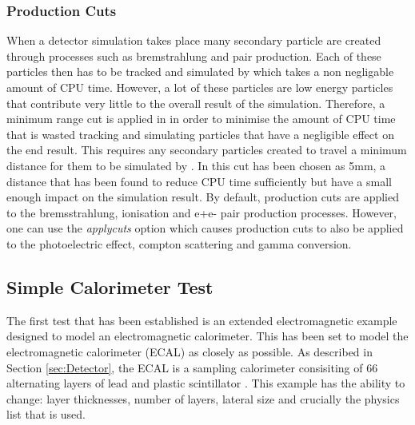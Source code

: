 \subsubsection{Production Cuts}\label{sec:products}When a detector simulation takes place many secondary particle are created through processes such as bremstrahlung and pair production.  Each of these particles then has to be tracked and simulated by \geant which takes a non negligable amount of CPU time. However, a lot of these particles are low energy particles that contribute very little to the overall result of the simulation.  Therefore, a minimum range cut is applied in \geant in order to minimise the amount of CPU time that is wasted tracking and simulating particles that have a negligible effect on the end result.  This requires any secondary particles created to travel a minimum distance for them to be simulated by \geant.  In \lhcb this cut has been chosen as 5mm, a distance that has been found to reduce CPU time sufficiently but have a small enough impact on the simulation result. By default, production cuts are applied to the bremsstrahlung, ionisation and e+e- pair production processes.  However, one can use the \textit{applycuts} option which causes production cuts to also be applied to the photoelectric effect, compton scattering and gamma conversion.


\subsection{Simple Calorimeter Test}
\label{sec:Simple Calorimeter Test}
The first test that has been established is an extended electromagnetic \geant example designed to model an electromagnetic calorimeter.  This has been set to model the \lhcb electromagnetic calorimeter (ECAL) as closely as possible. As described in Section \ref{sec:Detector}, the \lhcb ECAL is a sampling calorimeter consisiting of 66 alternating layers of lead and plastic scintillator \cite{LHCb-TDR-002}.  This example has the ability to change: layer thicknesses, number of layers, lateral size and crucially the physics list that is used.

